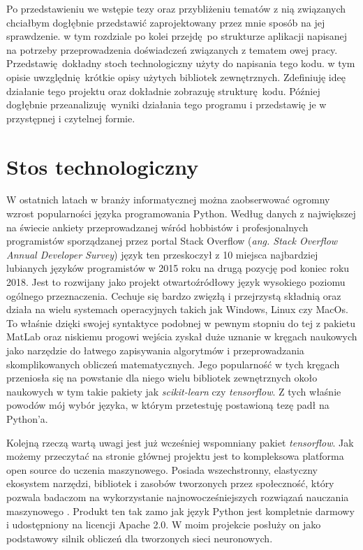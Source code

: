 \documentclass[12pt, oneside, a4paper]{report}
\begin{document}
Po przedstawieniu we wstępie tezy oraz przybliżeniu tematów z nią związanych chciałbym dogłębnie przedstawić zaprojektowany przez mnie sposób na jej sprawdzenie. w tym rozdziale po kolei przejdę po strukturze aplikacji napisanej na potrzeby przeprowadzenia doświadczeń związanych z tematem owej pracy. Przedstawię dokładny stoch technologiczny użyty do napisania tego kodu. w tym opisie uwzględnię krótkie opisy użytych bibliotek zewnętrznych. Zdefiniuję ideę działanie tego projektu oraz dokładnie zobrazuję strukturę kodu. Później dogłębnie przeanalizuję wyniki działania tego programu i przedstawię je w przystępnej i czytelnej formie.

\section{Stos technologiczny}

W ostatnich latach w branży informatycznej można zaobserwować ogromny wzrost popularności języka programowania Python. Według danych z największej na świecie ankiety przeprowadzanej wśród hobbistów i profesjonalnych programistów sporządzanej przez portal Stack Overflow (\textit{ang. Stack Overflow Annual Developer Survey}) \citep{stackoverflow-survey} język ten przeskoczył z 10 miejsca najbardziej lubianych języków programistów w 2015 roku na drugą pozycję pod koniec roku 2018. Jest to rozwijany jako projekt otwartoźródłowy język wysokiego poziomu ogólnego przeznaczenia. Cechuje się bardzo zwięzłą i przejrzystą składnią oraz działa na wielu systemach operacyjnych takich jak Windows, Linux czy MacOs. To właśnie dzięki swojej syntaktyce podobnej w pewnym stopniu do tej z pakietu MatLab oraz niskiemu progowi wejścia zyskał duże uznanie w kręgach naukowych jako narzędzie do łatwego zapisywania algorytmów i przeprowadzania skomplikowanych obliczeń matematycznych. Jego popularność w tych kręgach przeniosła się na powstanie dla niego wielu bibliotek zewnętrznych około naukowych w tym takie pakiety jak \textit{scikit-learn} czy \textit{tensorflow}. Z tych właśnie powodów mój wybór języka, w którym przetestuję postawioną tezę padł na Python'a.

Kolejną rzeczą wartą uwagi jest już wcześniej wspomniany pakiet \textit{tensorflow}. Jak możemy przeczytać na stronie głównej projektu jest to kompleksowa platforma open source do uczenia maszynowego. Posiada wszechstronny, elastyczny ekosystem narzędzi, bibliotek i zasobów tworzonych przez społeczność, który pozwala badaczom na wykorzystanie najnowocześniejszych rozwiązań nauczania maszynowego \citep{tensorflow-wesite}. Produkt ten tak zamo jak język Python jest kompletnie darmowy i udostępniony na licencji Apache 2.0. W moim projekcie posłuży on jako podstawowy silnik obliczeń dla tworzonych sieci neuronowych.
\end{document}
